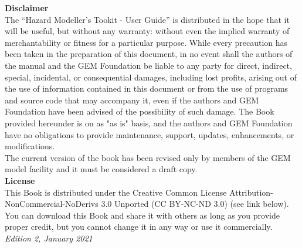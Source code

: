 \documentclass[11pt,fleqn]{book} %
\begin{document}
   {\bf{Disclaimer}} \hfill \\
\noindent
   The ``Hazard Modeller's Tookit - User Guide'' is distributed in the hope that it will be useful, but without any warranty: without 
   even the implied warranty of merchantability or fitness for a 
   particular purpose. While every 
   precaution has been taken in the preparation of this document, in 
   no event shall the authors of the manual and the GEM Foundation be 
   liable to any party for direct, indirect, special, incidental, or 
   consequential damages, including lost profits, arising out of the 
   use of information contained in this document or from the use of 
   programs and source code that may accompany it, even if the authors 
   and GEM Foundation have been advised of the possibility of such damage. 
   The Book provided hereunder is on as "as is" basis, and the authors 
   and GEM Foundation have no obligations to provide maintenance, support,
   updates, enhancements, or modifications. 
   \hfill \\
   The current version of the book has been revised only by members of 
   the GEM model facility and it must be considered a draft copy. 
   \vspace{0.4cm} \hfill \\
   {\bf{License}} \hfill \\
   This Book is distributed under the Creative Common License 
   Attribution-NonCommercial-NoDerivs 3.0 Unported (CC BY-NC-ND 3.0) 
   (see link below). You can download this Book and share it with 
   others as long as you provide proper credit, but you cannot change 
   it in any way or use it commercially. 
   \hfill \\

\noindent \textit{Edition 2, January 2021} %



\pagestyle{empty} %

\tableofcontents %

\cleardoublepage %
\end{document}
